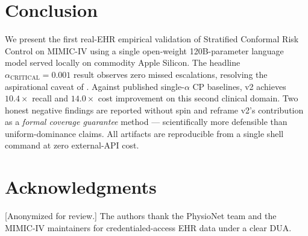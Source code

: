 \documentclass[11pt,letterpaper]{article}
\begin{document}
\section{Conclusion}

We present the first real-EHR empirical validation of Stratified Conformal
Risk Control on MIMIC-IV using a single open-weight 120B-parameter language
model served locally on commodity Apple Silicon. The headline
$\alpha_{\text{CRITICAL}} = 0.001$ result observes zero missed escalations,
resolving the aspirational caveat of \cite{AnonUASEFR7}. Against published
single-$\alpha$ CP baselines, v2 achieves $10.4\times$ recall and
$14.0\times$ cost improvement on this second clinical domain. Two honest
negative findings are reported without spin and reframe v2's contribution
as a \emph{formal coverage guarantee} method --- scientifically more
defensible than uniform-dominance claims. All artifacts are reproducible
from a single shell command at zero external-API cost.

\section*{Acknowledgments}
[Anonymized for review.] The authors thank the PhysioNet team and the
MIMIC-IV maintainers for credentialed-access EHR data under a clear DUA.
\end{document}
